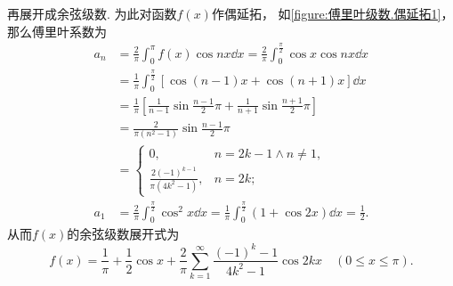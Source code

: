 \begin{example}
\begin{solution}
再展开成余弦级数.
为此对函数\(f(x)\)作偶延拓，
如\cref{figure:傅里叶级数.偶延拓1}，
那么傅里叶系数为\begin{align*}
	a_n &= \frac{2}{\pi} \int_0^{\pi} f(x) \cos nx \dd{x}
	= \frac{2}{\pi} \int_0^{\frac{\pi}{2}} \cos x \cos nx \dd{x} \\
	&= \frac{1}{\pi} \int_0^{\frac{\pi}{2}} [\cos(n-1)x + \cos(n+1)x] \dd{x} \\
	&= \frac{1}{\pi} \left[
			\frac{1}{n-1} \sin\frac{n-1}{2}\pi
			+ \frac{1}{n+1} \sin\frac{n+1}{2}\pi
		\right] \\
	&= \frac{2}{\pi(n^2-1)} \sin\frac{n-1}{2}\pi \\
	&= \left\{ \begin{array}{cl}
		0, & n=2k-1 \land n\neq1, \\
		\frac{2(-1)^{k-1}}{\pi(4k^2-1)}, & n=2k;
	\end{array} \right. \\
	a_1 &= \frac{2}{\pi} \int_0^{\frac{\pi}{2}} \cos^2 x \dd{x}
	= \frac{1}{\pi} \int_0^{\frac{\pi}{2}} (1+\cos 2x) \dd{x}
	= \frac{1}{2}.
\end{align*}
从而\(f(x)\)的余弦级数展开式为\[
	f(x) = \frac{1}{\pi} + \frac{1}{2} \cos x + \frac{2}{\pi}
		\sum\limits_{k=1}^\infty \frac{(-1)^k-1}{4k^2-1} \cos 2kx
	\quad(0 \leq x \leq \pi).
\]
\end{solution}
\end{example}

